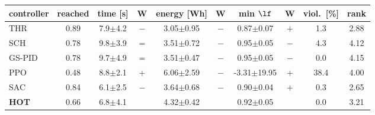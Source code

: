 \begin{tabular}{l|c|cc|cc|cc|c|c}\toprule
controller & reached & time [s] & W & energy [Wh] & W & min $\lf$ & W & viol.\ [\%] & rank\\\midrule
THR & 0.89 & 7.9$\pm$4.2 & $-$ & 3.05$\pm$0.95 & $-$ & 0.87$\pm$0.07 & $+$ & 1.3 & 2.88\\
SCH & 0.78 & 9.8$\pm$3.9 & $=$ & 3.51$\pm$0.72 & $-$ & 0.95$\pm$0.05 & $-$ & 4.3 & 4.12\\
GS-PID & 0.78 & 9.7$\pm$4.9 & $=$ & 3.51$\pm$0.47 & $-$ & 0.95$\pm$0.05 & $-$ & 0.0 & 4.15\\
PPO & 0.48 & 8.8$\pm$2.1 & $+$ & 6.06$\pm$2.59 & $-$ & -3.31$\pm$19.95 & $+$ & 38.4 & 4.00\\
SAC & 0.84 & 6.1$\pm$2.5 & $-$ & 3.64$\pm$0.68 & $-$ & 0.90$\pm$0.04 & $+$ & 0.3 & 2.65\\
\textbf{HOT} & 0.66 & 6.8$\pm$4.1 &  & 4.32$\pm$0.42 &  & 0.92$\pm$0.05 &  & 0.0 & 3.21\\
\bottomrule\end{tabular}